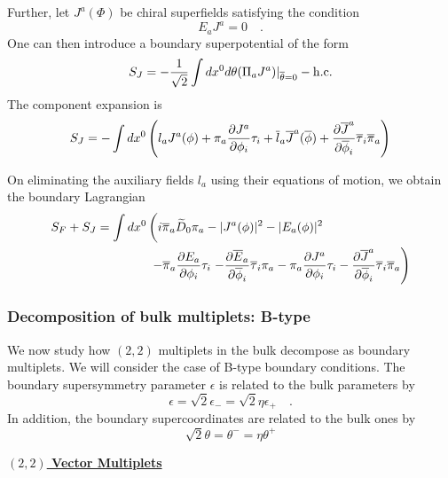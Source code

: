 \documentclass[a4paper,12pt]{article}
\begin{document}
Further, let $J^a(\Phi)$ be chiral
superfields satisfying the condition
\begin{equation}
E_a J^a =0\quad.
\end{equation}
One can then introduce a boundary superpotential of the form
\begin{equation}
S_J=-{1\over\sqrt2} \int dx^0 d\theta (\Pi_a J^a)|_{\overline{\theta}=0} -
{\rm h.c.}
\end{equation}
The component expansion is
\begin{equation}
S_J = -\int dx^0 \left( l_a J^a(\phi) + 
\pi_a {{\partial J^a}\over{\partial \phi_i}} \tau_i  
+ \overline{l}_a \overline{J}^a(\overline{\phi}) 
+ {{\partial \overline{J}^a}\over{\partial
\overline{\phi}_i}} \overline{\tau}_i  \overline{\pi}_a
\right) 
\end{equation}

On eliminating the auxiliary fields $l_a$ using their equations of
motion, we obtain the boundary Lagrangian
\begin{eqnarray}
\lefteqn{S_F + S_J = \int dx^0 \left(
i\overline{\pi}_a\widetilde{D}_0 \pi_a - |J^a(\phi)|^2 -
|E_a(\phi)|^2 \phantom{1\over2}\right.} \hspace{1in}\nonumber \\
&&- \overline{\pi}_a
{{\partial E_a}\over{\partial \phi_i}}\tau_i 
 \left.
- {{\partial \overline{E}_a}\over{\partial \overline{\phi}_i}}
\overline{\tau}_i \pi_a
- \pi_a {{\partial J^a}\over{\partial \phi_i}} \tau_i
- {{\partial \overline{J}^a}\over{\partial
\overline{\phi}_i}} \overline{\tau}_i  \overline{\pi}_a
\right)
\end{eqnarray}

\subsubsection{Decomposition of bulk multiplets: B-type}

We now study how  $(2,2)$ multiplets in the bulk
decompose as boundary multiplets. We will consider the case of B-type
boundary conditions. The boundary supersymmetry parameter $\epsilon$
is related to the bulk parameters by $$\epsilon=\sqrt2 \epsilon_-
=\sqrt2 \eta \epsilon_+\quad .$$ In addition, the 
boundary supercoordinates are related to the bulk ones by
$$
\sqrt2\theta=\theta^-=\eta\theta^+ 
$$
\begin{flushleft}
\underline{\bf $(2,2)$ Vector Multiplets}
\end{flushleft}
\end{document}
